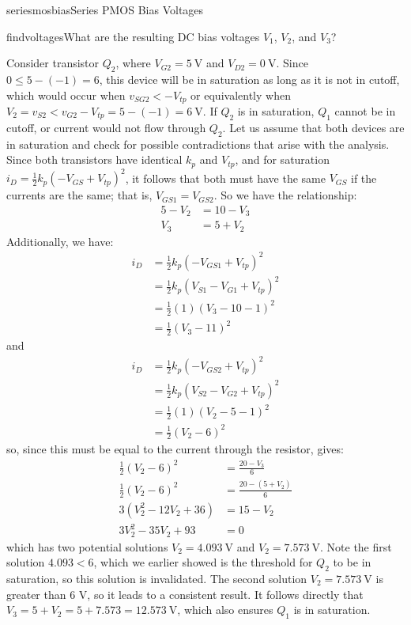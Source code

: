 \begin{mainquestion}{seriesmosbias}{Series PMOS Bias Voltages}
\begin{partquestion}{findvoltages}{What are the resulting DC bias voltages $V_{1}$, $V_{2}$, and $V_{3}$?}
\begin{answer}
Consider transistor $Q_{2}$, where $V_{G2} = \qty{5}{\volt}$ and $V_{D2} = \qty{0}{\volt}$. Since $0 \leq 5 - (-1) = 6$, this device will be in saturation as long as it is not in cutoff, which would occur when $v_{SG2} < -V_{tp}$ or equivalently when $V_{2} = v_{S2} < v_{G2} - V_{tp} = 5 - (-1) = \qty{6}{\volt}$. If $Q_{2}$ is in saturation, $Q_{1}$ cannot be in cutoff, or current would not flow through $Q_{2}$. Let us assume that both devices are in saturation and check for possible contradictions that arise with the analysis. Since both transistors have identical $k_{p}$ and $V_{tp}$, and for saturation $i_{D} = \frac{1}{2}k_{p}\left( - V_{GS} + V_{tp} \right)^{2}$, it follows that both must have the same $V_{GS}$ if the currents are the same; that is, $V_{GS1} = V_{GS2}$. So we have the relationship:
\begin{align*}
    5 - V_2 &= 10 - V_3 \\
    V_3 &= 5 + V_2
\end{align*}
Additionally, we have:
\begin{align*}
    i_D &= \frac{1}{2} k_p (-V_{GS1} +V_{tp})^2 \\
    &= \frac{1}{2} k_p (V_{S1} - V_{G1} + V_{tp})^2 \\
    &= \frac{1}{2} (1) (V_3 - 10 - 1)^2 \\
    &= \frac{1}{2} (V_3 - 11)^2
\end{align*}
and
\begin{align*}
    i_D &= \frac{1}{2} k_p (-V_{GS2} +V_{tp})^2 \\
    &= \frac{1}{2} k_p (V_{S2} - V_{G2} + V_{tp})^2 \\
    &= \frac{1}{2} (1) (V_2 - 5 - 1)^2 \\
    &= \frac{1}{2} (V_2 - 6)^2
\end{align*}
so, since this must be equal to the current through the resistor, gives:
\begin{align*}
    \frac{1}{2} (V_2 - 6)^2 &= \frac{20 - V_3}{6} \\
    \frac{1}{2} (V_2 - 6)^2 &= \frac{20 - (5+V_2)}{6} \\
    3 (V_2^2 - 12V_2 +36) &= 15 - V_2 \\
    3V_2^2 - 35V_2 + 93 &= 0
\end{align*}
which has two potential solutions $V_{2} = \qty{4.093}{\volt}$ and $V_{2} = \qty{7.573}{\volt}$. Note the first solution $4.093 < 6$, which we earlier showed is the threshold for $Q_{2}$ to be in saturation, so this solution is invalidated. The second solution $V_{2} = \qty{7.573}{\volt}$ is greater than 6 V, so it leads to a consistent result. It follows directly that $V_{3} = 5 + V_{2} = 5 + 7.573 = \qty{12.573}{\volt}$, which also ensures $Q_{1}$ is in saturation.
\end{answer}
\end{partquestion}


\end{mainquestion}
